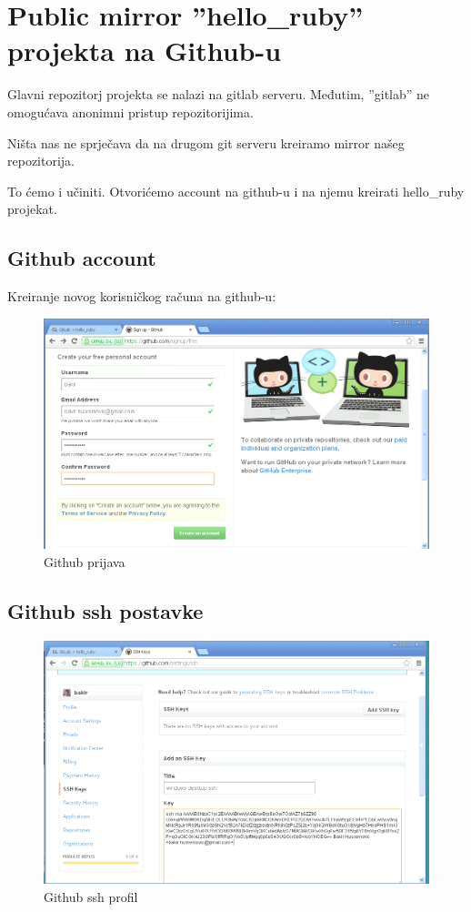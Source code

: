 \documentclass[times, utf8, seminar]{fit}
\begin{document}
\section{Public mirror ''hello\_ruby'' projekta na Github-u}

Glavni repozitorj projekta se nalazi na gitlab serveru. Međutim, ''gitlab'' ne omogućava anonimni pristup repozitorijima.

Ništa nas ne sprječava da na drugom git serveru kreiramo mirror našeg repozitorija.

To ćemo i učiniti. Otvorićemo account na github-u i na njemu kreirati hello\_ruby projekat.

\subsection{Github account}

Kreiranje novog korisničkog računa na github-u:

\begin{figure}[H]
\centering
\includegraphics[width=15cm]{img/github_prijava.png}
\caption{Github prijava}
\end{figure}

\subsection{Github ssh postavke}

\begin{figure}[H]
\centering
\includegraphics[width=15cm]{img/github_ssh_profile.png}
\caption{Github ssh profil}
\end{figure}
\end{document}
